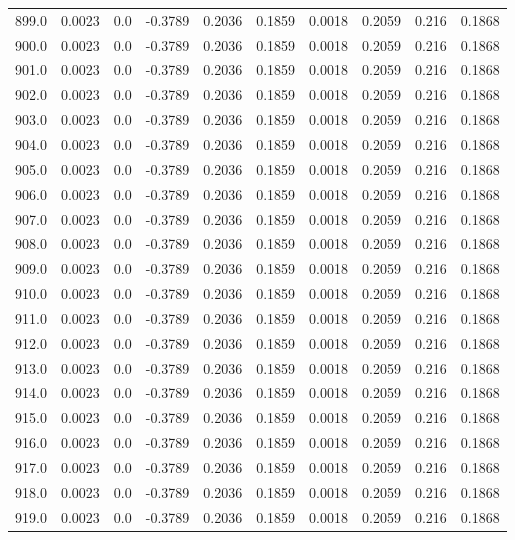 \begin{longtable}{lrrrrrrrrr}
899.0 & 0.0023 & 0.0 & -0.3789 & 0.2036 & 0.1859 & 0.0018 & 0.2059 & 0.216 & 0.1868 \\
900.0 & 0.0023 & 0.0 & -0.3789 & 0.2036 & 0.1859 & 0.0018 & 0.2059 & 0.216 & 0.1868 \\
901.0 & 0.0023 & 0.0 & -0.3789 & 0.2036 & 0.1859 & 0.0018 & 0.2059 & 0.216 & 0.1868 \\
902.0 & 0.0023 & 0.0 & -0.3789 & 0.2036 & 0.1859 & 0.0018 & 0.2059 & 0.216 & 0.1868 \\
903.0 & 0.0023 & 0.0 & -0.3789 & 0.2036 & 0.1859 & 0.0018 & 0.2059 & 0.216 & 0.1868 \\
904.0 & 0.0023 & 0.0 & -0.3789 & 0.2036 & 0.1859 & 0.0018 & 0.2059 & 0.216 & 0.1868 \\
905.0 & 0.0023 & 0.0 & -0.3789 & 0.2036 & 0.1859 & 0.0018 & 0.2059 & 0.216 & 0.1868 \\
906.0 & 0.0023 & 0.0 & -0.3789 & 0.2036 & 0.1859 & 0.0018 & 0.2059 & 0.216 & 0.1868 \\
907.0 & 0.0023 & 0.0 & -0.3789 & 0.2036 & 0.1859 & 0.0018 & 0.2059 & 0.216 & 0.1868 \\
908.0 & 0.0023 & 0.0 & -0.3789 & 0.2036 & 0.1859 & 0.0018 & 0.2059 & 0.216 & 0.1868 \\
909.0 & 0.0023 & 0.0 & -0.3789 & 0.2036 & 0.1859 & 0.0018 & 0.2059 & 0.216 & 0.1868 \\
910.0 & 0.0023 & 0.0 & -0.3789 & 0.2036 & 0.1859 & 0.0018 & 0.2059 & 0.216 & 0.1868 \\
911.0 & 0.0023 & 0.0 & -0.3789 & 0.2036 & 0.1859 & 0.0018 & 0.2059 & 0.216 & 0.1868 \\
912.0 & 0.0023 & 0.0 & -0.3789 & 0.2036 & 0.1859 & 0.0018 & 0.2059 & 0.216 & 0.1868 \\
913.0 & 0.0023 & 0.0 & -0.3789 & 0.2036 & 0.1859 & 0.0018 & 0.2059 & 0.216 & 0.1868 \\
914.0 & 0.0023 & 0.0 & -0.3789 & 0.2036 & 0.1859 & 0.0018 & 0.2059 & 0.216 & 0.1868 \\
915.0 & 0.0023 & 0.0 & -0.3789 & 0.2036 & 0.1859 & 0.0018 & 0.2059 & 0.216 & 0.1868 \\
916.0 & 0.0023 & 0.0 & -0.3789 & 0.2036 & 0.1859 & 0.0018 & 0.2059 & 0.216 & 0.1868 \\
917.0 & 0.0023 & 0.0 & -0.3789 & 0.2036 & 0.1859 & 0.0018 & 0.2059 & 0.216 & 0.1868 \\
918.0 & 0.0023 & 0.0 & -0.3789 & 0.2036 & 0.1859 & 0.0018 & 0.2059 & 0.216 & 0.1868 \\
919.0 & 0.0023 & 0.0 & -0.3789 & 0.2036 & 0.1859 & 0.0018 & 0.2059 & 0.216 & 0.1868 \\

\end{longtable}

